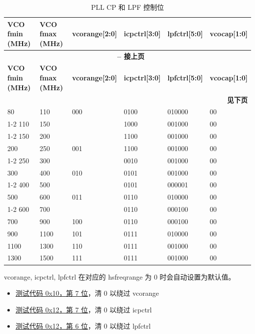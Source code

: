 \documentclass[main\_\_CN.tex]{subfiles}
\begin{document}
\begin{longtable}{|p{3cm}|p{3cm}|p{3cm}|p{2cm}|p{2cm}|p{2cm}|}
    \caption{PLL CP 和 LPF 控制位} \label{tab:pll-cp-and-lpf-control-bits} \\
    \hline
    \rowcolor{lightgray}
    \textbf{VCO fmin (MHz)} & \textbf{VCO fmax (MHz)} & \textbf{vcorange[2:0]} & \textbf{icpctrl[3:0]} & \textbf{lpfctrl[5:0]} & \textbf{vcocap[1:0]} \\ \hline
    \endfirsthead

    \multicolumn{6}{c}{\bfseries \tablename\ \thetable{} -- 接上页}\\\hline
    \rowcolor{lightgray}
    \textbf{VCO fmin (MHz)} & \textbf{VCO fmax (MHz)} & \textbf{vcorange[2:0]} & \textbf{icpctrl[3:0]} & \textbf{lpfctrl[5:0]} & \textbf{vcocap[1:0]} \\ \hline
    \endhead

    \multicolumn{6}{r}{\textbf{见下页}} \\
    \endfoot

    \endlastfoot
    
    80   & 110  & 000 & 0100 & 010000 & 00 \\ \cline{1-2} \cline{4-6}
    110  & 150  &     & 1000 & 001000 & 00 \\ \cline{1-2} \cline{4-6}
    150  & 200  &     & 1100 & 001000 & 00 \\ \hline
    200  & 250  & 001 & 1100 & 001000 & 00 \\ \cline{1-2} \cline{4-6}
    250  & 300  &     & 0010 & 001000 & 00 \\ \hline
    300  & 400  & 010 & 0101 & 001000 & 00 \\ \cline{1-2} \cline{4-6}
    400  & 500  &     & 0101 & 000001 & 00 \\ \hline
    500  & 600  & 011 & 0110 & 010000 & 00 \\ \cline{1-2} \cline{4-6}
    600  & 700  &     & 0110 & 000100 & 00 \\ \hline
    700  & 900  & 100 & 0110 & 000100 & 00 \\ \hline
    900  & 1100 & 101 & 0111 & 010000 & 00 \\ \hline
    1100 & 1300 & 110 & 0111 & 001000 & 00 \\ \hline
    1300 & 1500 & 111 & 0111 & 001000 & 00 \\ \hline
\end{longtable}

\begin{tiplisting}
    vcorange, icpctrl, lpfctrl 在对应的 hsfreqrange 为 0 时会自动设置为默认值。
    \begin{itemize}
        \item \hyperref[sec:test-code-0x10]{测试代码 0x10，第 7 位}，清 0 以绕过 vcorange
        \item \hyperref[sec:test-code-0x12]{测试代码 0x12，第 7 位}，清 0 以绕过 icpctrl
        \item \hyperref[sec:test-code-0x12]{测试代码 0x12，第 6 位}，清 0 以绕过 lpfctrl
    \end{itemize}
\end{tiplisting}
\end{document}
